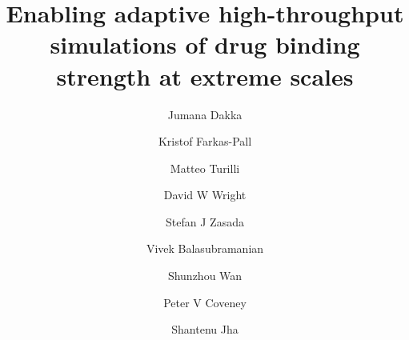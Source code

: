 \documentclass[manuscript, review, screen]{acmart}
\begin{document}
\title{Enabling adaptive high-throughput simulations of drug binding strength at extreme scales} 

\author{Jumana Dakka}
\orcid{}
\affiliation{%
  \institution{}
  \streetaddress{}
  \city{}
  \state{}
  \postcode{}
  \country{}}
\email{}
\author{Kristof Farkas-Pall}
\orcid{}
\email{}
\author{Matteo Turilli}
\orcid{}
\affiliation{%
  \institution{}
  \city{}
  \country{}
}
\email{}
\author{David W Wright}
\author{Stefan J Zasada}
\orcid{}
\email{}
\author{Vivek Balasubramanian}
\orcid{}
\affiliation{%
  \institution{}
  \city{}
  \country{}
}
\email{}
\author{Shunzhou Wan}
\orcid{}
\email{}
\author{Peter V Coveney}
\orcid{}
\email{}
\author{Shantenu Jha}
\orcid{}
\affiliation{%
  \institution{}
  \city{}
  \country{}
}
\email{}


\renewcommand\shortauthors{Dakka, J. et al}
\end{document}
